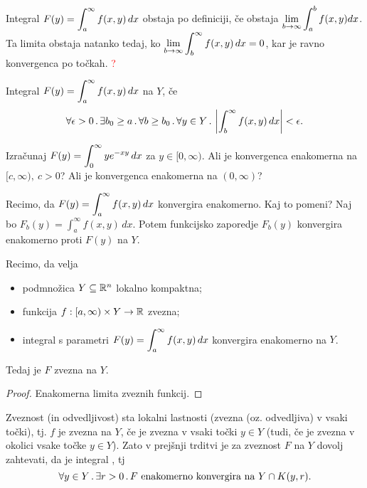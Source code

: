 \begin{opomba}
    Integral \(\displaystyle F(y) = \int_{a}^{\infty} f(x,y) \, dx\) obstaja po definiciji, če obstaja $\displaystyle \lim_{b \to \infty} \int_{a}^{b} f(x,y) dx$. Ta limita obstaja natanko tedaj, ko $\displaystyle \lim_{b \to \infty} \int_{b}^{\infty} f(x,y) \, dx = 0$, kar je ravno konvergenca po točkah. \textcolor{red}{?}
\end{opomba}

\begin{definicija}
    Integral \(\displaystyle F(y) = \int_{a}^{\infty} f(x,y) \, dx\)  na \(Y\), če 
    $$\forall \epsilon > 0 \,.\, \exists b_0 \geq a \,.\, \forall b \geq b_0 \,.\, \forall y \in Y \,.\, \left|\int_{b}^{\infty} f(x,y) \, dx \right| < \epsilon.$$
\end{definicija}

\begin{zgled}
    Izračunaj \(\displaystyle F(y) = \int_{0}^{\infty} y e^{-xy} \, dx\) za \(y \in [0, \infty)\). Ali je konvergenca enakomerna na \([c, \infty), \ c > 0\)? Ali je konvergenca enakomerna na $(0, \infty)$?
\end{zgled}

\begin{opomba}
    Recimo, da \(\displaystyle F(y) = \int_{a}^{\infty} f(x,y) \, dx\) konvergira enakomerno. Kaj to pomeni? Naj bo $F_b(y) = \int_{a}^{\infty} f(x,y) \, dx$. Potem funkcijsko zaporedje $F_b(y)$ konvergira enakomerno proti $F(y)$ na $Y$.
\end{opomba}

\begin{trditev}
    Recimo, da velja
    \begin{itemize}
        \item podmnožica \(Y \subseteq \mathbb{R}^n\) lokalno kompaktna;
        \item funkcija \(f :[a, \infty) \times Y \to \mathbb{R}\) zvezna;
        \item integral s parametri \(\displaystyle F(y) = \int_{a}^{\infty} f(x,y) \, dx\) konvergira enakomerno na \(Y\).
    \end{itemize}
    Tedaj je \(F\) zvezna na \(Y\).
\end{trditev}

\begin{proof}
    Enakomerna limita zveznih funkcij.
\end{proof}

\begin{opomba}
    Zveznost (in odvedljivost) sta lokalni lastnosti (zvezna (oz. odvedljiva) v vsaki točki), tj. $f$ je zvezna na $Y$, če je zvezna v vsaki točki \(y \in Y\) (tudi, če je zvezna v okolici vsake točke \(y \in Y\)). Zato v prejšnji trditvi je za zveznost \(F\) na \(Y\) dovolj zahtevati, da je integral , tj
    $$\forall y\in Y \,.\, \exists r>0 \,.\, F \text{ enakomerno konvergira na } Y \cap K(y,r).$$
\end{opomba}

